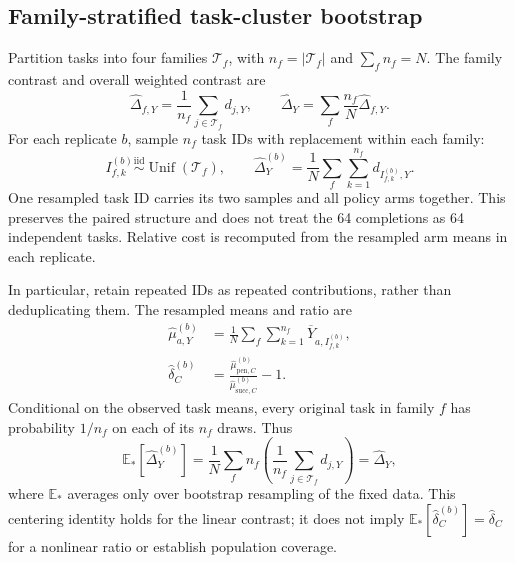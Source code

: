 \documentclass[11pt]{article}
\newcommand{\E}{\mathbb{E}}
\begin{document}
\subsection{Family-stratified task-cluster bootstrap}

Partition tasks into four families $\mathcal T_f$, with $n_f=|\mathcal T_f|$ and $\sum_fn_f=N$. The family contrast and overall weighted contrast are
\begin{equation}
 \widehat\Delta_{f,Y}=\frac1{n_f}\sum_{j\in\mathcal T_f}d_{j,Y},
 \qquad \widehat\Delta_Y=\sum_f\frac{n_f}{N}\widehat\Delta_{f,Y}.
\end{equation}
For each replicate $b$, sample $n_f$ task IDs with replacement within each family:
\begin{equation}
 I^{(b)}_{f,k}\overset{\mathrm{iid}}\sim\operatorname{Unif}(\mathcal T_f),
 \qquad \widehat\Delta^{(b)}_Y=
 \frac1N\sum_f\sum_{k=1}^{n_f}d_{I^{(b)}_{f,k},Y}.
\end{equation}
One resampled task ID carries its two samples and all policy arms together. This preserves the paired structure and does not treat the 64 completions as 64 independent tasks. Relative cost is recomputed from the resampled arm means in each replicate.

In particular, retain repeated IDs as repeated contributions, rather than deduplicating them. The resampled means and ratio are
\begin{align}
 \widehat\mu^{(b)}_{a,Y}&=\frac1N\sum_f\sum_{k=1}^{n_f}
                           \overline Y_{a,I^{(b)}_{f,k}},\\
 \widehat\delta_C^{(b)}&=
       \frac{\widehat\mu^{(b)}_{\mathrm{pen},C}}
            {\widehat\mu^{(b)}_{\mathrm{succ},C}}-1.
\end{align}
Conditional on the observed task means, every original task in family $f$ has probability $1/n_f$ on each of its $n_f$ draws. Thus
\begin{equation}
 \E_*[\widehat\Delta_Y^{(b)}]
 =\frac1N\sum_f n_f\left(\frac1{n_f}\sum_{j\in\mathcal T_f}d_{j,Y}\right)
 =\widehat\Delta_Y,
\end{equation}
where $\E_*$ averages only over bootstrap resampling of the fixed data. This centering identity holds for the linear contrast; it does not imply $\E_*[\widehat\delta_C^{(b)}]=\widehat\delta_C$ for a nonlinear ratio or establish population coverage.
\end{document}
